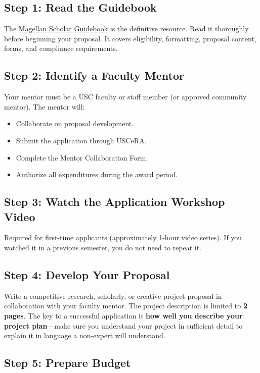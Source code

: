 \documentclass[11pt, letterpaper]{article}
\begin{document}
\subsection{Step 1: Read the Guidebook}

The \href{https://sc.edu/about/offices_and_divisions/undergraduate_research/documents/mgs_guidebook.pdf}{Magellan Scholar Guidebook} is the definitive resource. Read it thoroughly before beginning your proposal. It covers eligibility, formatting, proposal content, forms, and compliance requirements.

\subsection{Step 2: Identify a Faculty Mentor}

Your mentor must be a USC faculty or staff member (or approved community mentor). The mentor will:
\begin{itemize}[nosep]
    \item Collaborate on proposal development.
    \item Submit the application through USCeRA.
    \item Complete the Mentor Collaboration Form.
    \item Authorize all expenditures during the award period.
\end{itemize}

\subsection{Step 3: Watch the Application Workshop Video}

Required for first-time applicants (approximately 1-hour video series). If you watched it in a previous semester, you do not need to repeat it.

\subsection{Step 4: Develop Your Proposal}

Write a competitive research, scholarly, or creative project proposal in collaboration with your faculty mentor. The project description is limited to \textbf{2 pages}. The key to a successful application is \textbf{how well you describe your project plan}---make sure you understand your project in sufficient detail to explain it in language a non-expert will understand.

\subsection{Step 5: Prepare Budget}
\end{document}
